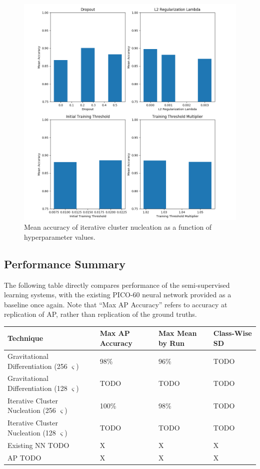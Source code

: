 \documentclass[10pt]{article}
\begin{document}
\begin{figure}[H]
    \centering
    \includegraphics[width=\textwidth]{icn_acc_by_hyper}
    \caption{\label{icn_acc_by_hyper} Mean accuracy of iterative cluster nucleation as a function of hyperparameter values.}
\end{figure}

\subsection{Performance Summary}

The following table directly compares performance of the semi-supervised learning systems, with the existing PICO-60 neural network provided as a baseline once again. Note that ``Max AP Accuracy'' refers to accuracy at replication of AP, rather than replication of the ground truths.

\begin{tabular}{|l|l|l|l|}
    \hline
    Technique & Max AP Accuracy & Max Mean by Run & Class-Wise SD \\
    \hline
    Gravitational Differentiation (256 $\varsigma$) & 98\% & 96\% & TODO \\
    \hline
    Gravitational Differentiation (128 $\varsigma$) & TODO & TODO & TODO \\
    \hline
    Iterative Cluster Nucleation (256 $\varsigma$) & 100\% & 98\% & TODO \\
    \hline
    Iterative Cluster Nucleation (128 $\varsigma$) & TODO & TODO & TODO \\
    \hline
    Existing NN TODO & X & X & X \\
    \hline
    AP TODO & X & X & X \\
    \hline
\end{tabular}
\end{document}
